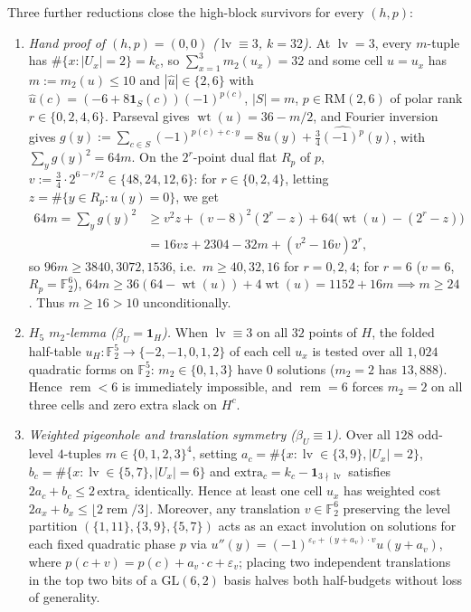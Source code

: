 \documentclass[11pt]{article}
\theoremstyle{definition}
\theoremstyle{remark}
\newcommand{\F}{\mathbb{F}}
\newcommand{\wt}{\operatorname{wt}}
\newcommand{\ind}{\mathbf{1}}
\newcommand{\RM}{\mathrm{RM}}
\DeclareRobustCommand{\_}{\textunderscore\allowbreak}
\begin{document}
Three further reductions close the high-block survivors for every $(h,p)$:
\begin{enumerate}[label=(R\arabic*),nosep]
\item \emph{Hand proof of $(h,p)=(0,0)$ ($\operatorname{lv}\equiv3$, $k=32$).} At $\operatorname{lv}=3$, every $m$-tuple has $\#\{x:|U_x|=2\}=k_c$, so $\sum_{x=1}^3 m_2(u_x)=32$ and some cell $u=u_x$ has $m:=m_2(u)\le10$ and $|\widehat u|\in\{2,6\}$ with $\widehat u(c)=(-6+8\ind_S(c))(-1)^{p(c)}$, $|S|=m$, $p\in\RM(2,6)$ of polar rank $r\in\{0,2,4,6\}$. Parseval gives $\wt(u)=36-m/2$, and Fourier inversion gives $g(y):=\sum_{c\in S}(-1)^{p(c)+c\cdot y}=8u(y)+\tfrac34\widehat{(-1)^p}(y)$, with $\sum_y g(y)^2=64m$. On the $2^r$-point dual flat $R_p$ of $p$, $v:=\tfrac34\cdot2^{6-r/2}\in\{48,24,12,6\}$: for $r\in\{0,2,4\}$, letting $z=\#\{y\in R_p:u(y)=0\}$, we get
\begin{align*}
  64m=\sum_y g(y)^2
  &\ge v^2z+(v-8)^2(2^r-z)+64\big(\wt(u)-(2^r-z)\big)\\
  &=16vz+2304-32m+(v^2-16v)2^r,
\end{align*}
so $96m\ge3840,3072,1536$, i.e.\ $m\ge40,32,16$ for $r=0,2,4$; for $r=6$ ($v=6$, $R_p=\F_2^6$), $64m\ge36(64-\wt(u))+4\wt(u)=1152+16m\implies m\ge24$. Thus $m\ge16>10$ unconditionally.
\item \emph{$H_5$ $m_2$-lemma ($\beta_U=\ind_H$).} When $\operatorname{lv}\equiv3$ on all $32$ points of $H$, the folded half-table $u_H:\F_2^5\to\{-2,-1,0,1,2\}$ of each cell $u_x$ is tested over all $1{,}024$ quadratic forms on $\F_2^5$: $m_2\in\{0,1,3\}$ have $0$ solutions ($m_2=2$ has $13{,}888$). Hence $\operatorname{rem}<6$ is immediately impossible, and $\operatorname{rem}=6$ forces $m_2=2$ on all three cells and zero extra slack on $H^c$.
\item \emph{Weighted pigeonhole and translation symmetry ($\beta_U\equiv1$).} Over all $128$ odd-level $4$-tuples $m\in\{0,1,2,3\}^4$, setting $a_c=\#\{x:\operatorname{lv}\in\{3,9\},|U_x|=2\}$, $b_c=\#\{x:\operatorname{lv}\in\{5,7\},|U_x|=6\}$ and $\mathrm{extra}_c=k_c-\ind_{3\nmid\operatorname{lv}}$ satisfies $2a_c+b_c\le2\,\mathrm{extra}_c$ identically. Hence at least one cell $u_x$ has weighted cost $2a_x+b_x\le\lfloor 2\operatorname{rem}/3\rfloor$. Moreover, any translation $v\in\F_2^6$ preserving the level partition $(\{1,11\},\{3,9\},\{5,7\})$ acts as an exact involution on solutions for each fixed quadratic phase $p$ via $u''(y)=(-1)^{\varepsilon_v+(y+a_v)\cdot v}u(y+a_v)$, where $p(c+v)=p(c)+a_v\cdot c+\varepsilon_v$; placing two independent translations in the top two bits of a $\mathrm{GL}(6,2)$ basis halves both half-budgets without loss of generality.
\end{enumerate}
\end{document}
